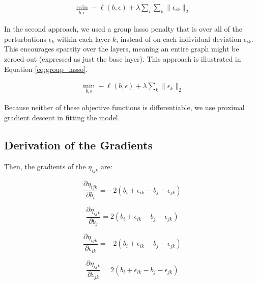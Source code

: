 \documentclass{article}
\begin{document}
\begin{align} \label{eq:lasso}
\min_{b, \epsilon} -\ell(b, \epsilon) + \lambda \sum_i\sum_{k} \| \epsilon_{ik}\|_2
\end{align}

In the second approach, we used a group lasso penalty that is over all of the perturbations $\epsilon_k$ within each layer $k$, instead of on each individual deviation $\epsilon_{ik}$. This encourages sparsity over the layers, meaning an entire graph might be zeroed out (expressed as just the base layer). This approach is illustrated in Equation \ref{eq:group_lasso}.

\begin{align} \label{eq:group_lasso}
\min_{b, \epsilon} -\ell(b, \epsilon) + \lambda \sum_k \| \epsilon_{k}\|_2
\end{align}



Because neither of these objective functions is differentiable, we use proximal gradient descent in fitting the model. %

\subsection{Derivation of the Gradients}


Then, the gradients of the $\eta_{ijk}$ are:

\[
\frac{\partial \eta_{ijk}}{\partial b_{i}} =  - 2(b_i + \epsilon_{ik} - b_j - \epsilon_{jk})
\]

\[
\frac{\partial \eta_{ijk}}{\partial b_{j}} = 2(b_i + \epsilon_{ik} - b_j - \epsilon_{jk})
\]

\[
\frac{\partial \eta_{ijk}}{\partial \epsilon_{ik}} = - 2(b_i + \epsilon_{ik} - b_j - \epsilon_{jk})
\]

\[
\frac{\partial \eta_{ijk}}{\partial \epsilon_{jk}} = 2(b_i + \epsilon_{ik} - b_j - \epsilon_{jk})
\]
\end{document}

